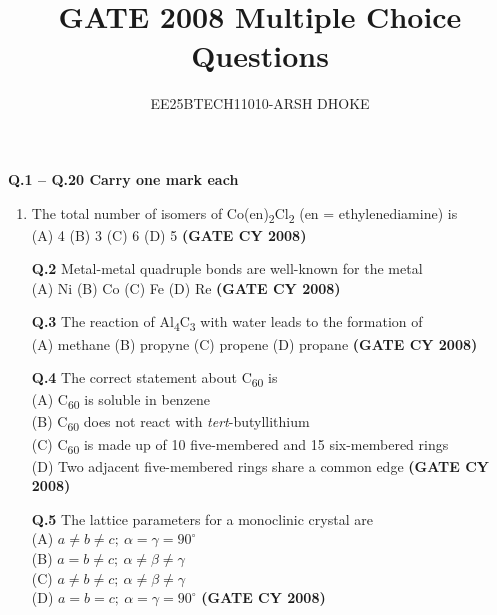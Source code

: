 \documentclass[12pt]{article}
\author{EE25BTECH11010-ARSH DHOKE}
\title{GATE 2008 Multiple Choice Questions}
\date{}
\begin{document}
\maketitle

\textbf{Q.1 -- Q.20 Carry one mark each}

\begin{enumerate}

   \item   The total number of isomers of Co(en)\textsubscript{2}Cl\textsubscript{2} (en = ethylenediamine) is\\
    (A) 4 \quad (B) 3 \quad (C) 6 \quad (D) 5                         
      \textbf{(GATE CY 2008)}

    \vspace{0.5cm}

   \textbf{Q.2}  Metal-metal quadruple bonds are well-known for the metal\\
    (A) Ni \quad (B) Co \quad (C) Fe \quad (D) Re   
  \textbf{(GATE CY 2008)}
    
    \vspace{0.5cm}

    \textbf{Q.3} The reaction of Al\textsubscript{4}C\textsubscript{3} with water leads to the formation of\\
    (A) methane \quad (B) propyne \quad (C) propene \quad (D) propane  
  \textbf{(GATE CY 2008)}

    \vspace{0.5cm}

   \textbf{Q.4}  The correct statement about C\textsubscript{60} is\\
    (A) C\textsubscript{60} is soluble in benzene\\
    (B) C\textsubscript{60} does not react with \textit{tert}-butyllithium\\
    (C) C\textsubscript{60} is made up of 10 five-membered and 15 six-membered rings\\
    (D) Two adjacent five-membered rings share a common edge   \textbf{(GATE CY 2008)}

    \vspace{0.5cm}

   \textbf{Q.5} The lattice parameters for a monoclinic crystal are\\
    (A) $a \neq b \neq c; \ \alpha = \gamma = 90^\circ$\\
    (B) $a = b \neq c; \ \alpha \neq \beta \neq \gamma$\\
    (C) $a \neq b \neq c; \ \alpha \neq \beta \neq \gamma$\\
    (D) $a = b = c; \ \alpha = \gamma = 90^\circ$   \textbf{(GATE CY 2008)}



\end{enumerate}
\end{document}
